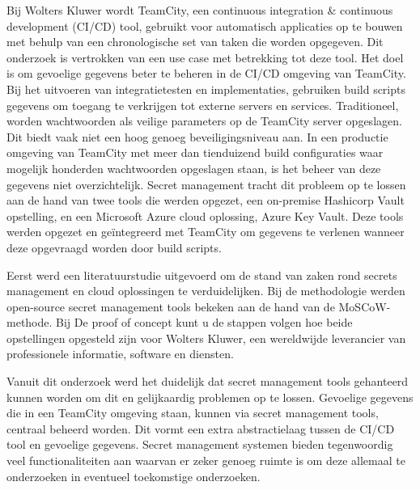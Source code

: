 Bij Wolters Kluwer wordt TeamCity, een continuous integration \& continuous development (CI/CD) tool, gebruikt voor automatisch applicaties op te bouwen met behulp van een chronologische set van taken die worden opgegeven. Dit onderzoek is vertrokken van een use case met betrekking tot deze tool. Het doel is om gevoelige gegevens beter te beheren in de CI/CD omgeving van TeamCity. Bij het uitvoeren van integratietesten en implementaties, gebruiken build scripts gegevens om toegang te verkrijgen tot externe servers en services. Traditioneel, worden wachtwoorden als veilige parameters op de TeamCity server opgeslagen. Dit biedt vaak niet een hoog genoeg beveiligingsniveau aan. In een productie omgeving van TeamCity met meer dan tienduizend build configuraties waar mogelijk honderden wachtwoorden opgeslagen staan, is het beheer van deze gegevens niet overzichtelijk. Secret management tracht dit probleem op te lossen aan de hand van twee tools die werden opgezet, een on-premise Hashicorp Vault opstelling, en een Microsoft Azure cloud oplossing, Azure Key Vault. Deze tools werden opgezet en geïntegreerd met TeamCity om gegevens te verlenen wanneer deze opgevraagd worden door build scripts. 

Eerst werd een literatuurstudie uitgevoerd om de stand van zaken rond secrets management en cloud oplossingen te verduidelijken. Bij de methodologie werden open-source secret management tools bekeken aan de hand van de MoSCoW-methode. Bij De proof of concept kunt u de stappen volgen hoe beide opstellingen opgesteld zijn voor Wolters Kluwer, een wereldwijde leverancier van professionele informatie, software en diensten. 

Vanuit dit onderzoek werd het duidelijk dat secret management tools gehanteerd kunnen worden om dit en gelijkaardig problemen op te lossen. Gevoelige gegevens die in een TeamCity omgeving staan, kunnen via secret management tools, centraal beheerd worden. Dit vormt een extra abstractielaag tussen de CI/CD tool en gevoelige gegevens. Secret management systemen bieden tegenwoordig veel functionaliteiten aan waarvan er zeker genoeg ruimte is om deze allemaal te onderzoeken in eventueel toekomstige onderzoeken.